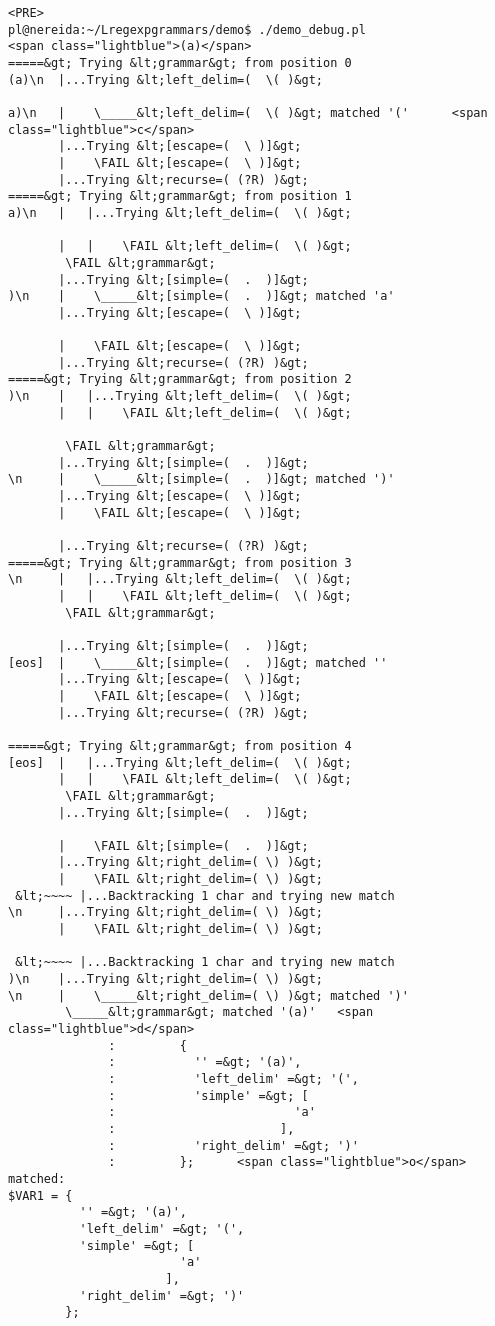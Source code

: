 \begin{verbatim}
<PRE>
pl@nereida:~/Lregexpgrammars/demo$ ./demo_debug.pl
<span class="lightblue">(a)</span>
=====&gt; Trying &lt;grammar&gt; from position 0
(a)\n  |...Trying &lt;left_delim=(  \( )&gt;

a)\n   |    \_____&lt;left_delim=(  \( )&gt; matched '('      <span class="lightblue">c</span>
       |...Trying &lt;[escape=(  \ )]&gt;
       |    \FAIL &lt;[escape=(  \ )]&gt;
       |...Trying &lt;recurse=( (?R) )&gt;
=====&gt; Trying &lt;grammar&gt; from position 1
a)\n   |   |...Trying &lt;left_delim=(  \( )&gt;

       |   |    \FAIL &lt;left_delim=(  \( )&gt;
        \FAIL &lt;grammar&gt;
       |...Trying &lt;[simple=(  .  )]&gt;
)\n    |    \_____&lt;[simple=(  .  )]&gt; matched 'a'
       |...Trying &lt;[escape=(  \ )]&gt;

       |    \FAIL &lt;[escape=(  \ )]&gt;
       |...Trying &lt;recurse=( (?R) )&gt;
=====&gt; Trying &lt;grammar&gt; from position 2
)\n    |   |...Trying &lt;left_delim=(  \( )&gt;
       |   |    \FAIL &lt;left_delim=(  \( )&gt;

        \FAIL &lt;grammar&gt;
       |...Trying &lt;[simple=(  .  )]&gt;
\n     |    \_____&lt;[simple=(  .  )]&gt; matched ')'
       |...Trying &lt;[escape=(  \ )]&gt;
       |    \FAIL &lt;[escape=(  \ )]&gt;

       |...Trying &lt;recurse=( (?R) )&gt;
=====&gt; Trying &lt;grammar&gt; from position 3
\n     |   |...Trying &lt;left_delim=(  \( )&gt;
       |   |    \FAIL &lt;left_delim=(  \( )&gt;
        \FAIL &lt;grammar&gt;

       |...Trying &lt;[simple=(  .  )]&gt;
[eos]  |    \_____&lt;[simple=(  .  )]&gt; matched ''
       |...Trying &lt;[escape=(  \ )]&gt;
       |    \FAIL &lt;[escape=(  \ )]&gt;
       |...Trying &lt;recurse=( (?R) )&gt;

=====&gt; Trying &lt;grammar&gt; from position 4
[eos]  |   |...Trying &lt;left_delim=(  \( )&gt;
       |   |    \FAIL &lt;left_delim=(  \( )&gt;
        \FAIL &lt;grammar&gt;
       |...Trying &lt;[simple=(  .  )]&gt;

       |    \FAIL &lt;[simple=(  .  )]&gt;
       |...Trying &lt;right_delim=( \) )&gt;
       |    \FAIL &lt;right_delim=( \) )&gt;
 &lt;~~~~ |...Backtracking 1 char and trying new match
\n     |...Trying &lt;right_delim=( \) )&gt;
       |    \FAIL &lt;right_delim=( \) )&gt;

 &lt;~~~~ |...Backtracking 1 char and trying new match
)\n    |...Trying &lt;right_delim=( \) )&gt;
\n     |    \_____&lt;right_delim=( \) )&gt; matched ')'
        \_____&lt;grammar&gt; matched '(a)'   <span class="lightblue">d</span>
              :         {
              :           '' =&gt; '(a)',
              :           'left_delim' =&gt; '(',
              :           'simple' =&gt; [
              :                         'a'
              :                       ],
              :           'right_delim' =&gt; ')'
              :         };      <span class="lightblue">o</span>
matched:
$VAR1 = {
          '' =&gt; '(a)',
          'left_delim' =&gt; '(',
          'simple' =&gt; [
                        'a'
                      ],
          'right_delim' =&gt; ')'
        };


\end{verbatim}
